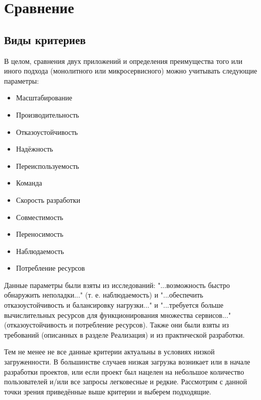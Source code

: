 \section{Сравнение}

\subsection{Виды критериев}
    В целом, сравнения двух приложений и определения преимущества того или иного подхода (монолитного или микросервисного) можно учитывать следующие параметры:

    \begin{itemize}
        \item Масштабирование
        \item Производительность
        \item Отказоустойчивость
        \item Надёжность
        \item Переиспользуемость
        \item Команда
        \item Скорость разработки
        \item Совместимость
        \item Переносимость
        \item Наблюдаемость
        \item Потребление ресурсов
    \end{itemize}

    Данные параметры были взяты из исследований: "...возможность быстро обнаружить неполадки..." \cite{шитько2017проектирование} (т. е. наблюдаемость) и "...обеспечить отказоустойчивость и балансировку нагрузки..." и "...требуется больше вычислительных ресурсов для функционирования множества сервисов..." \cite{артамонов2016разработка} (отказоустойчивость и потребление ресурсов). Также они были взяты из требований (описанных в разделе Реализация) и из практической разработки.

    Тем не менее не все данные критерии актуальны в условиях низкой загруженности. В большинстве случаев низкая загрузка возникает или в начале разработки проектов, или если проект был нацелен на небольшое количество пользователей и/или все запросы легковесные и редкие. Рассмотрим с данной точки зрения приведённые выше критерии и выберем подходящие.

